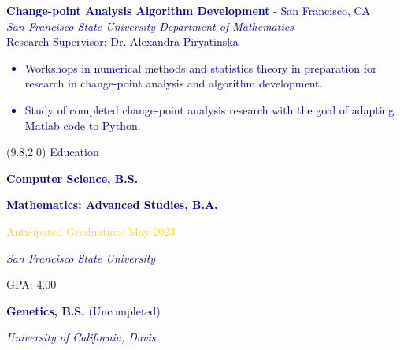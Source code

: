 \documentclass[hidelinks, 10pt]{article}
\newcommand{\bodyspacing}{1mm}
\begin{document}
\begin{textblock}{9}
\vspace{\bodyspacing}

\textcolor{navy}{{\textbf{Change-point Analysis Algorithm Development} - San Francisco, CA}\\
\emph{San Francisco State University Department of Mathematics}\\
Research Supervisor: Dr. Alexandra Piryatinska
    \begin{itemize}[leftmargin=5mm]
        \setlength\itemsep{-0.25em}
        \item Workshops in numerical methods and statistics theory in
        preparation for research in change-point analysis and algorithm
        development.
        \item Study of completed change-point analysis research with the goal of
        adapting Matlab code to Python.
    \end{itemize}}
\end{textblock}

\begin{textblock}{4}(9.8,2.0)
	\setlength{\parindent}{0cm}
    \large{\textcolor{navy}{Education}}

	\vspace{4mm}

	\footnotesize\textcolor{navy}{\scriptsize\textbf{Computer Science, B.S.}}

	\vspace{0.5mm}

	\footnotesize\textcolor{navy}{\scriptsize\textbf{Mathematics: Advanced Studies, B.A.}}

	\vspace{0.5mm}

	\scriptsize\textcolor{gold}{\scriptsize Anticipated Graduation: May 2023}

	\vspace{0.5mm}

	\scriptsize\textcolor{navy}{\scriptsize\emph{San Francisco State University}}

	\vspace{0.5mm}

	\scriptsize{\scriptsize GPA: 4.00}

	\vspace{4mm}

	\footnotesize\textcolor{navy}{\scriptsize\textbf{Genetics, B.S.} (Uncompleted)}

	\vspace{0.5mm}

	\scriptsize\textcolor{navy}{\scriptsize\emph{University of California, Davis}}
\end{textblock}
\end{document}
